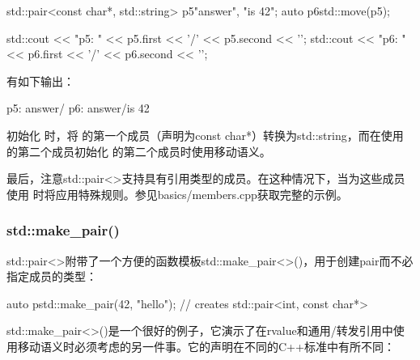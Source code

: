 \begin{cppcode}
std::pair<const char*, std::string> p5{"answer", "is 42"};
auto p6{std::move(p5)};

std::cout << "p5: " << p5.first << '/' << p5.second << '\n';
std::cout << "p6: " << p6.first << '/' << p6.second << '\n';
\end{cppcode}

有如下输出：

\begin{outputcode}
p5: answer/
p6: answer/is 42
\end{outputcode}

初始化  时，将  的第一个成员（声明为const char*）转换为std::string，而在使用  的第二个成员初始化  的第二个成员时使用移动语义。

最后，注意std::pair<>支持具有引用类型的成员。在这种情况下，当为这些成员使用  时将应用特殊规则。参见basics/members.cpp获取完整的示例。

\subsubsection{std::make_pair()}

std::pair<>附带了一个方便的函数模板std::make_pair<>()，用于创建pair而不必指定成员的类型：

\begin{cppcode}
auto p{std::make_pair(42, "hello")}; // creates std::pair<int, const char*>
\end{cppcode}

std::make_pair<>()是一个很好的例子，它演示了在rvalue和通用/转发引用中使用移动语义时必须考虑的另一件事。它的声明在不同的C++标准中有所不同：

